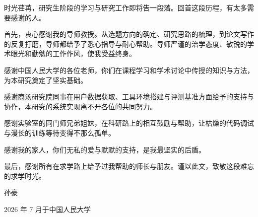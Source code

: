 \begin{acknowledge}
时光荏苒，研究生阶段的学习与研究工作即将告一段落。回首这段历程，有太多需要感谢的人。

首先，衷心感谢我的导师教授。从选题方向的确定、研究思路的梳理，到论文写作的反复打磨，导师都给予了悉心指导与耐心帮助。导师严谨的治学态度、敏锐的学术眼光和勤勉的工作作风，使我受益终身。

感谢中国人民大学的各位老师，你们在课程学习和学术讨论中传授的知识与方法，为本研究奠定了坚实基础。

感谢商汤研究院同事在用户数据获取、工具环境搭建与评测基准方面给予的支持与协作，本研究的系统实现离不开各位的共同努力。

感谢实验室的同门师兄弟姐妹，在科研路上的相互鼓励与帮助，让枯燥的代码调试与漫长的训练等待变得不那么孤单。

感谢我的家人，你们无私的爱与默默的支持，是我最坚实的后盾。

最后，感谢所有在求学路上给予过我帮助的师长与朋友。谨以此文，致敬这段难忘的求学时光。

\hfill 孙豪

\hfill 2026 年 7 月于中国人民大学
\end{acknowledge}
